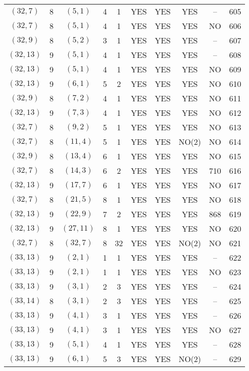\begin{longtable}{|c|c|c|c|c|c|c|c|c|c|}
$(32, 7)$ & 8 & $(5, 1)$ & 4 & 1 & YES & YES & YES & -- & 605\\
$(32, 7)$ & 8 & $(5, 1)$ & 4 & 1 & YES & YES & YES & NO & 606\\
$(32, 9)$ & 8 & $(5, 2)$ & 3 & 1 & YES & YES & YES & -- & 607\\
$(32, 13)$ & 9 & $(5, 1)$ & 4 & 1 & YES & YES & YES & -- & 608\\
$(32, 13)$ & 9 & $(5, 1)$ & 4 & 1 & YES & YES & YES & NO & 609\\
$(32, 13)$ & 9 & $(6, 1)$ & 5 & 2 & YES & YES & YES & NO & 610\\
$(32, 9)$ & 8 & $(7, 2)$ & 4 & 1 & YES & YES & YES & NO & 611\\
$(32, 13)$ & 9 & $(7, 3)$ & 4 & 1 & YES & YES & YES & NO & 612\\
$(32, 7)$ & 8 & $(9, 2)$ & 5 & 1 & YES & YES & YES & NO & 613\\
$(32, 7)$ & 8 & $(11, 4)$ & 5 & 1 & YES & YES & NO(2) & NO & 614\\
$(32, 9)$ & 8 & $(13, 4)$ & 6 & 1 & YES & YES & YES & NO & 615\\
$(32, 7)$ & 8 & $(14, 3)$ & 6 & 2 & YES & YES & YES & 710 & 616\\
$(32, 13)$ & 9 & $(17, 7)$ & 6 & 1 & YES & YES & YES & NO & 617\\
$(32, 7)$ & 8 & $(21, 5)$ & 8 & 1 & YES & YES & YES & NO & 618\\
$(32, 13)$ & 9 & $(22, 9)$ & 7 & 2 & YES & YES & YES & 868 & 619\\
$(32, 13)$ & 9 & $(27, 11)$ & 8 & 1 & YES & YES & YES & NO & 620\\
$(32, 7)$ & 8 & $(32, 7)$ & 8 & 32 & YES & YES & NO(2) & NO & 621\\
$(33, 13)$ & 9 & $(2, 1)$ & 1 & 1 & YES & YES & YES & -- & 622\\
$(33, 13)$ & 9 & $(2, 1)$ & 1 & 1 & YES & YES & YES & NO & 623\\
$(33, 13)$ & 9 & $(3, 1)$ & 2 & 3 & YES & YES & YES & -- & 624\\
$(33, 14)$ & 8 & $(3, 1)$ & 2 & 3 & YES & YES & YES & -- & 625\\
$(33, 13)$ & 9 & $(4, 1)$ & 3 & 1 & YES & YES & YES & -- & 626\\
$(33, 13)$ & 9 & $(4, 1)$ & 3 & 1 & YES & YES & YES & NO & 627\\
$(33, 13)$ & 9 & $(5, 1)$ & 4 & 1 & YES & YES & YES & -- & 628\\
$(33, 13)$ & 9 & $(6, 1)$ & 5 & 3 & YES & YES & NO(2) & -- & 629\\

\end{longtable}
